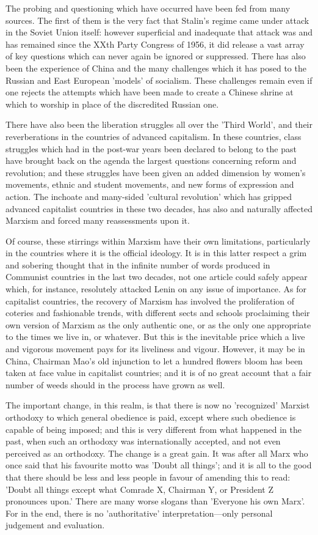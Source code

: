 The probing and questioning which have occurred have been fed from many sources. The first of them is the very fact that Stalin's regime came under attack in the Soviet Union itself: however superficial and inadequate that attack was and has remained since the XXth Party Congress of 1956, it did release a vast array of key questions which can never again be ignored or suppressed. There has also been the experience of China and the many challenges which it has posed to the Russian and East European 'models' of socialism. These challenges remain even if one rejects the attempts which have been made to create a Chinese shrine at which to worship in place of the discredited Russian one.

There have also been the liberation struggles all over the 'Third World', and their reverberations in the countries of advanced capitalism. In these countries, class struggles which had in the post-war years been declared to belong to the past have brought back on the agenda the largest questions concerning reform and revolution; and these struggles have been given an added dimension by women's movements, ethnic and student movements, and new forms of expression and action. The inchoate and many-sided 'cultural revolution' which has gripped advanced capitalist countries in these two decades, has also and naturally affected Marxism and forced many reassessments upon it.

Of course, these stirrings within Marxism have their own limitations, particularly in the countries where it is the official ideology. It is in this latter respect a grim and sobering thought that in the infinite number of words produced in Communist countries in the last two decades, not one article could safely appear which, for instance, resolutely attacked Lenin on any issue of importance. As for capitalist countries, the recovery of Marxism has involved the proliferation of coteries and fashionable trends, with different sects and schools proclaiming their own version of Marxism as the only authentic one, or as the only one appropriate to the times we live in, or whatever. But this is the inevitable price which a live and vigorous movement pays for its liveliness and vigour. However, it may be in China, Chairman Mao's old injunction to let a hundred flowers bloom has been taken at face value in capitalist countries; and it is of no great account that a fair number of weeds should in the process have grown as well.

The important change, in this realm, is that there is now no 'recognized' Marxist orthodoxy to which general obedience is paid, except where such obedience is capable of being imposed; and this is very different from what happened in the past, when such an orthodoxy was internationally accepted, and not even perceived as an orthodoxy. The change is a great gain. It was after all Marx who once said that his favourite motto was 'Doubt all things'; and it is all to the good that there should be less and less people in favour of amending this to read: 'Doubt all things except what Comrade X, Chairman Y, or President Z pronounces upon.' There are many worse slogans than 'Everyone his own Marx'. For in the end, there is no 'authoritative' interpretation—only personal judgement and evaluation.

